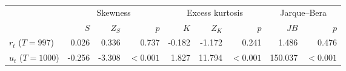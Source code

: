 \begin{tabular}{lrrrrrrrr}
\toprule
 & \multicolumn{3}{c}{Skewness} & \multicolumn{3}{c}{Excess kurtosis} & \multicolumn{2}{c}{Jarque--Bera} \\
 & $S$ & $Z_S$ & $p$ & $K$ & $Z_K$ & $p$ & $JB$ & $p$ \\
\midrule
$r_t$ ($T=997$) & 0.026 & 0.336 & 0.737 & -0.182 & -1.172 & 0.241 & 1.486 & 0.476 \\
$u_t$ ($T=1000$) & -0.256 & -3.308 & $<0.001$ & 1.827 & 11.794 & $<0.001$ & 150.037 & $<0.001$ \\
\bottomrule
\end{tabular}
